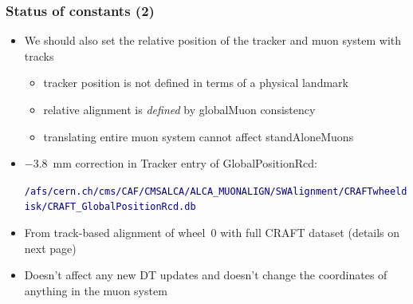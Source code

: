 \documentclass[compress]{beamer}
\begin{document}
\begin{frame}
\frametitle{Status of constants (2)}

\begin{itemize}\setlength{\itemsep}{0.2 cm}
\item We should also set the relative position of the tracker and
  muon system with tracks
\begin{itemize}\setlength{\itemsep}{0.1 cm}
\item tracker position is not defined in terms of a physical landmark
\item relative alignment is {\it defined} by globalMuon consistency
\item translating entire muon system cannot affect standAloneMuons
\end{itemize}

\item $-$3.8~mm correction in Tracker entry of GlobalPositionRcd:

\textcolor{darkblue}{\tiny \tt /afs/cern.ch/cms/CAF/CMSALCA/ALCA\_MUONALIGN/SWAlignment/CRAFTwheeldisk/CRAFT\_GlobalPositionRcd.db}

\item From track-based alignment of wheel~0 with full CRAFT dataset (details on next page)

\item Doesn't affect any new DT updates and doesn't change the coordinates of anything in the muon system
\end{itemize}


\end{frame}
\end{document}
